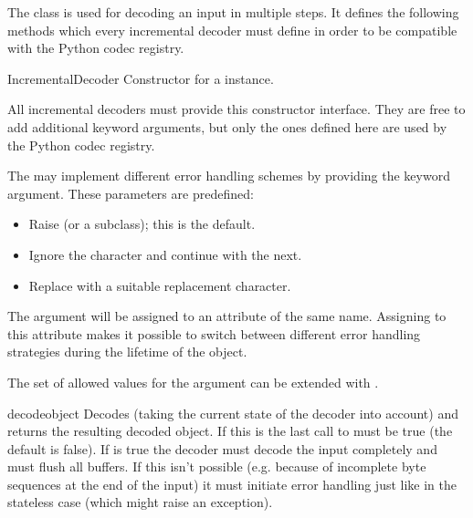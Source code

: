 The  class is used for decoding an input in multiple
steps. It defines the following methods which every incremental decoder must
define in order to be compatible with the Python codec registry.

\begin{classdesc}{IncrementalDecoder}{}
  Constructor for a  instance.

  All incremental decoders must provide this constructor interface. They are
  free to add additional keyword arguments, but only the ones defined
  here are used by the Python codec registry.

  The  may implement different error handling
  schemes by providing the  keyword argument. These
  parameters are predefined:

  \begin{itemize}
    \item {} Raise  (or a subclass);
                          this is the default.
    \item {} Ignore the character and continue with the next.
    \item {} Replace with a suitable replacement character.
  \end{itemize}

  The  argument will be assigned to an attribute of the
  same name. Assigning to this attribute makes it possible to switch
  between different error handling strategies during the lifetime
  of the  object.

  The set of allowed values for the  argument can
  be extended with .
\end{classdesc}

\begin{methoddesc}{decode}{object}
  Decodes  (taking the current state of the decoder into account)
  and returns the resulting decoded object. If this is the last call to
    must be true (the default is false).
  If  is true the decoder must decode the input completely and must
  flush all buffers. If this isn't possible (e.g. because of incomplete byte
  sequences at the end of the input) it must initiate error handling just like
  in the stateless case (which might raise an exception).
\end{methoddesc}

